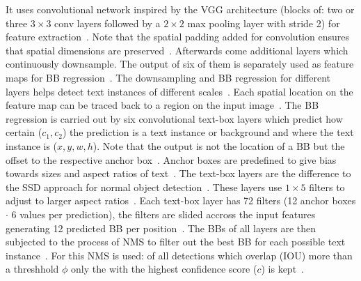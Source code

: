 It uses convolutional network inspired by the VGG architecture (blocks of: two or
three $3\times3$ conv layers followed by a $2\times2$ max pooling layer with stride 2) for feature
extraction~\citep{liao_textboxes_2017,simonyan_very_2015}.
Note that the spatial padding added for convolution ensures that spatial dimensions are
preserved~\citep{simonyan_very_2015}.
Afterwards come additional layers which continuously downsample.
The output of six of them is separately used as feature maps for \ac{BB}
regression~\citep{liao_textboxes_2017}.
The downsampling and \ac{BB} regression for different layers helps detect text instances of different
scales~\citep{liu_ssd_2016}.
Each spatial location on the feature map can be traced back to a region on the input
image~\citep{long_scene_2021}.
The \ac{BB} regression is carried out by six convolutional text-box layers which predict how
certain ($c_1,c_2$) the prediction is a text instance or background and where the text instance
is ($x,y,w,h$).
Note that the output is not the location of a \ac{BB} but the offset to the
respective anchor box~\citep{liao_textboxes_2017,long_scene_2021}.
Anchor boxes are predefined to give bias towards sizes and aspect ratios of
text~\citep{liao_textboxes_2017}.
The text-box layers are the difference to the SSD approach for normal object
detection~\citep{liao_textboxes_2017,liu_ssd_2016}.
These layers use $1\times5$ filters to adjust to larger aspect ratios~\citep{liao_textboxes_2017}.
Each text-box layer has 72 filters (12 anchor boxes $\cdot$ 6 values per prediction), the filters
are slided accross the input features generating 12 predicted \ac{BB} per
position~\citep{liao_textboxes_2017}.
The \acp{BB} of all layers are then subjected to the process of \ac{NMS} to filter out the best
\ac{BB} for each possible text instance~\citep{liao_textboxes_2017}.
For this \ac{NMS} is used: of all detections which overlap (\ac{IOU}) more than a threshhold
$\phi$ only the with the highest confidence score ($c$) is kept~\citep{hosang_learning_2017}.

